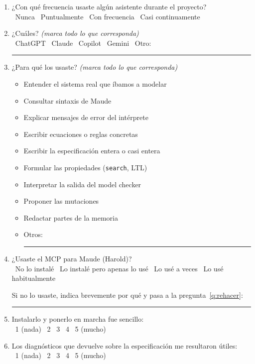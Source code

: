 \begin{enumerate}[leftmargin=*,resume]

\item ¿Con qu\'e frecuencia usaste alg\'un asistente durante el proyecto?\\
\cb\ Nunca \quad
\cb\ Puntualmente \quad
\cb\ Con frecuencia \quad
\cb\ Casi continuamente

\item ¿Cu\'ales? \emph{(marca todo lo que corresponda)}\\
\cb\ ChatGPT \quad \cb\ Claude \quad \cb\ Copilot \quad \cb\ Gemini \quad
\cb\ Otro: \rule{4cm}{0.4pt}

\item ¿Para qu\'e los usaste? \emph{(marca todo lo que corresponda)}

\begin{itemize}[leftmargin=*,label=\cb,itemsep=1pt]
\item Entender el sistema real que \'ibamos a modelar
\item Consultar sintaxis de Maude
\item Explicar mensajes de error del int\'erprete
\item Escribir ecuaciones o reglas concretas
\item Escribir la especificaci\'on entera o casi entera
\item Formular las propiedades (\texttt{search}, LTL)
\item Interpretar la salida del model checker
\item Proponer las mutaciones
\item Redactar partes de la memoria
\item Otros: \rule{5cm}{0.4pt}
\end{itemize}

\item ¿Usaste el MCP para Maude (Harold)?\\
\cb\ No lo instal\'e \quad
\cb\ Lo instal\'e pero apenas lo us\'e \quad
\cb\ Lo us\'e a veces \quad
\cb\ Lo us\'e habitualmente

\smallskip
{\small Si no lo usaste, indica brevemente por qu\'e y pasa a la
pregunta~\ref{q:rehacer}: \rule{5.5cm}{0.4pt}}

\item Instalarlo y ponerlo en marcha fue sencillo:\\
\cb\ 1 (nada) \quad \cb\ 2 \quad \cb\ 3 \quad \cb\ 4 \quad \cb\ 5 (mucho)

\item Los diagn\'osticos que devuelve sobre la especificaci\'on me resultaron
\'utiles:\\
\cb\ 1 (nada) \quad \cb\ 2 \quad \cb\ 3 \quad \cb\ 4 \quad \cb\ 5 (mucho)


\end{enumerate}
